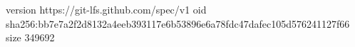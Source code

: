 version https://git-lfs.github.com/spec/v1
oid sha256:bb7e7a2f2d8132a4eeb393117e6b53896e6a78fdc47dafec105d576241127f66
size 349692
